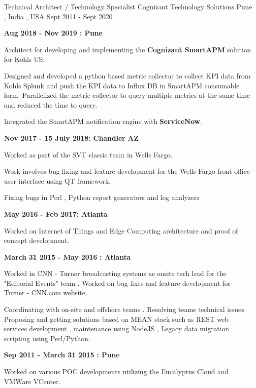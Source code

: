 \begin{cventries}
  \cventry
    {Technical Architect / Technology Specialist}
    {Cognizant Technology Solutions}
    {Pune  , India , USA}
    {Sept 2011 - Sept 2020}
    {
      \begin{cvitems}
        \item \textbf{Aug 2018 - Nov 2019 : Pune}          
        \item Architect for developing and implementing the \textbf{Cognizant SmartAPM} solution for Kohls US.
        \item Designed and developed a python based metric collector to collect KPI data from Kohls Splunk and push the KPI data to Influx DB in SmartAPM consumable form. Parallelized the metric collector to query multiple metrics at the same time and reduced the time to query.      
        \item Integrated the SmartAPM notification engine with \textbf{ServiceNow}.        
        \item \textbf{Nov 2017 - 15 July 2018: Chandler AZ}                
        \item Worked as part of the SVT classic team in Wells Fargo.
        \item Work involves bug fixing and feature development for the Wells Fargo front office user interface using QT framework.
        \item Fixing bugs in Perl , Python report generators and log analyzers              
        \item \textbf{May 2016 - Feb 2017: Atlanta}                
        \item Worked on Internet of Things and Edge Computing architecture and proof of concept development.
        \item \textbf{March 31 2015 - May 2016 : Atlanta}                
        \item Worked in CNN - Turner broadcasting systems as onsite tech lead for the "Editorial Events" team . Worked on bug fixes and feature development for Turner - CNN.com website.
        \item Coordinating with on-site and offshore teams . Resolving teams technical issues. Proposing and getting solutions based on MEAN stack such as REST web services development , maintenance using NodeJS ,  Legacy data migration scripting using Perl/Python.                
        \item \textbf{Sep 2011 - March 31 2015 : Pune}                
        \item Worked on various POC developments utilizing the Eucalyptus Cloud and VMWare VCenter.

\end{cvitems}}
\end{cventries}

